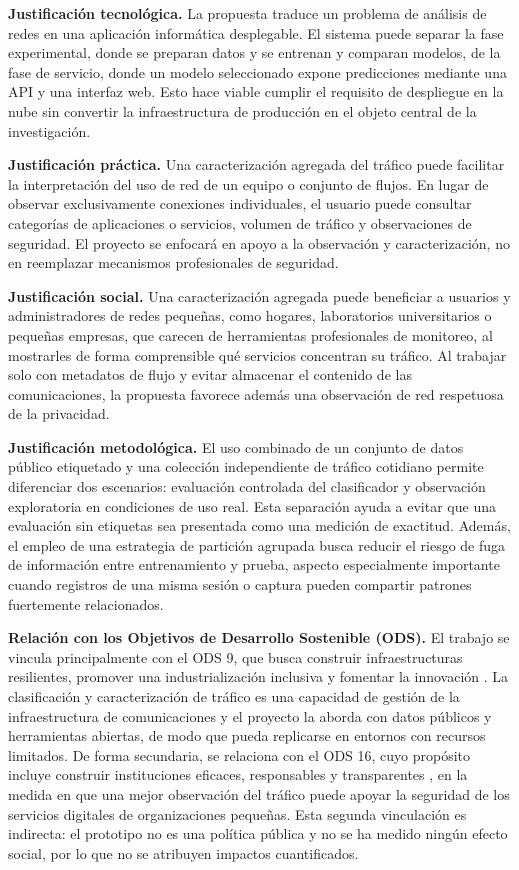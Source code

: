 \documentclass[conference]{IEEEtran}
\begin{document}
\textbf{Justificación tecnológica.} La propuesta traduce un problema de análisis de redes en una aplicación informática desplegable. El sistema puede separar la fase experimental, donde se preparan datos y se entrenan y comparan modelos, de la fase de servicio, donde un modelo seleccionado expone predicciones mediante una API y una interfaz web. Esto hace viable cumplir el requisito de despliegue en la nube sin convertir la infraestructura de producción en el objeto central de la investigación.

\textbf{Justificación práctica.} Una caracterización agregada del tráfico puede facilitar la interpretación del uso de red de un equipo o conjunto de flujos. En lugar de observar exclusivamente conexiones individuales, el usuario puede consultar categorías de aplicaciones o servicios, volumen de tráfico y observaciones de seguridad. El proyecto se enfocará en apoyo a la observación y caracterización, no en reemplazar mecanismos profesionales de seguridad.

\textbf{Justificación social.} Una caracterización agregada puede beneficiar a usuarios y administradores de redes pequeñas, como hogares, laboratorios universitarios o pequeñas empresas, que carecen de herramientas profesionales de monitoreo, al mostrarles de forma comprensible qué servicios concentran su tráfico. Al trabajar solo con metadatos de flujo y evitar almacenar el contenido de las comunicaciones, la propuesta favorece además una observación de red respetuosa de la privacidad.

\textbf{Justificación metodológica.} El uso combinado de un conjunto de datos público etiquetado y una colección independiente de tráfico cotidiano permite diferenciar dos escenarios: evaluación controlada del clasificador y observación exploratoria en condiciones de uso real. Esta separación ayuda a evitar que una evaluación sin etiquetas sea presentada como una medición de exactitud. Además, el empleo de una estrategia de partición agrupada busca reducir el riesgo de fuga de información entre entrenamiento y prueba, aspecto especialmente importante cuando registros de una misma sesión o captura pueden compartir patrones fuertemente relacionados.

\textbf{Relación con los Objetivos de Desarrollo Sostenible (ODS).} El trabajo se vincula principalmente con el ODS 9, que busca construir infraestructuras resilientes, promover una industrialización inclusiva y fomentar la innovación \cite{ods9}. La clasificación y caracterización de tráfico es una capacidad de gestión de la infraestructura de comunicaciones y el proyecto la aborda con datos públicos y herramientas abiertas, de modo que pueda replicarse en entornos con recursos limitados. De forma secundaria, se relaciona con el ODS 16, cuyo propósito incluye construir instituciones eficaces, responsables y transparentes \cite{ods16}, en la medida en que una mejor observación del tráfico puede apoyar la seguridad de los servicios digitales de organizaciones pequeñas. Esta segunda vinculación es indirecta: el prototipo no es una política pública y no se ha medido ningún efecto social, por lo que no se atribuyen impactos cuantificados.
\end{document}
